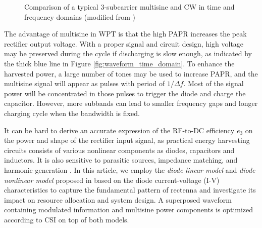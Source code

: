 %
%

\begin{figure}[ht]
  \centering
  \caption{Comparison of a typical 3-subcarrier multisine and CW in time and frequency domains (modified from \cite{Trotter2009})}
  \label{fig:waveform_comparison}
\end{figure}

The advantage of multisine in WPT is that the high PAPR increases the peak rectifier output voltage. With a proper signal and circuit design, high voltage may be preserved during the cycle if discharging is slow enough, as indicated by the thick blue line in Figure \ref{fig:waveform_time_domain}. To enhance the harvested power, a large number of tones may be used to increase PAPR, and the multisine signal will appear as pulses with period of $1/\Delta f$. Most of the signal power will be concentrated in those pulses to trigger the diode and charge the capacitor. However, more subbands can lead to smaller frequency gaps and longer charging cycle when the bandwidth is fixed.

It can be hard to derive an accurate expression of the RF-to-DC efficiency ${e_3}$ on the power and shape of the rectifier input signal, as practical energy harvesting circuits consists of various nonlinear components as diodes, capacitors and inductors. It is also sensitive to parasitic sources, impedance matching, and harmonic generation \cite{Strassner2013, Valenta2014}. In this article, we employ the \textit{diode linear model} and \textit{diode nonlinear model} proposed in \cite{Clerckx2016} based on the diode current-voltage (I-V) characteristics to capture the fundamental pattern of rectenna and investigate its impact on resource allocation and system design. A superposed waveform containing modulated information and multisine power components is optimized according to CSI on top of both models.



